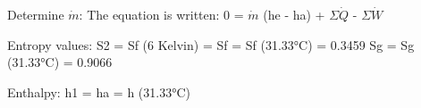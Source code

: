 Determine \( \dot{m} \):  
The equation is written:  
0 = \( \dot{m} \) (he - ha) + \( \Sigma \dot{Q} \) - \( \Sigma \dot{W} \)  

Entropy values:  
S2 = Sf (6 Kelvin) =  
Sf = Sf (31.33°C) = 0.3459  
Sg = Sg (31.33°C) = 0.9066  

Enthalpy:  
h1 = ha = h (31.33°C)